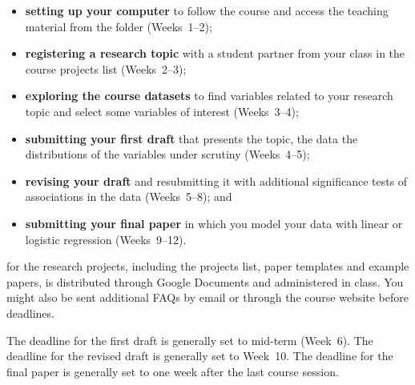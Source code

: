 \begin{itemize}
  \item \textbf{setting up your computer} to follow the course and access the teaching material from the \SRQM folder (Weeks~1--2);%
  \item \textbf{registering a research topic} with a student partner from your class in the course projects list (Weeks~2--3);%
  \item \textbf{exploring the course datasets} to find variables related to your research topic and select some variables of interest (Weeks~3--4);%
  \item \textbf{submitting your first draft} that presents the topic, the data the distributions of the variables under scrutiny (Weeks~4--5);%
  \item \textbf{revising your draft} and resubmitting it with additional significance tests of associations in the data (Weeks~5--8); and%
  \item \textbf{submitting your final paper} in which you model your data with linear or logistic regression (Weeks~9--12).%
\end{itemize}

 for the research projects, including the projects list, paper templates and example papers, is distributed through Google Documents and administered in class. You might also be sent additional FAQs by email or through the course website before deadlines.%

 The deadline for the first draft is generally set to mid-term (Week~6). The deadline for the revised draft is generally set to Week~10. The deadline for the final paper is generally set to one week after the last course session.%

